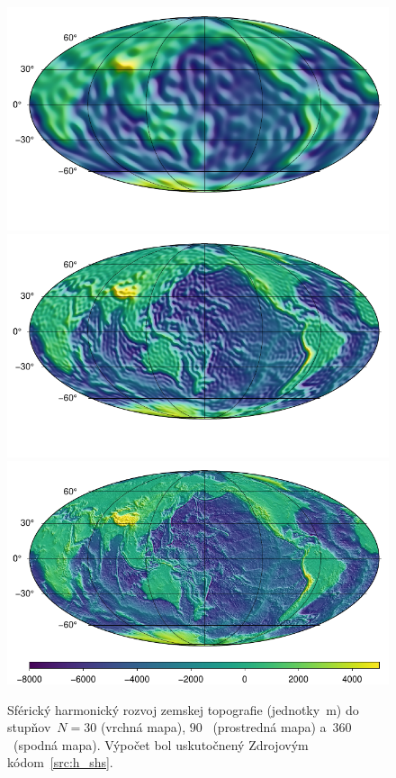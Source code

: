 \documentclass[a4paper,12pt]{book}
\begin{document}
\begin{figure}
\centering
\includegraphics{./fig-h-shs-nmax30.pdf}
\includegraphics{./fig-h-shs-nmax90.pdf}
\includegraphics{./fig-h-shs-nmax360.pdf}
\caption{Sférický harmonický rozvoj zemskej topografie (jednotky~m) do 
stupňov~$N = 30$ (vrchná mapa), $90$~ (prostredná mapa) a~$360$~(spodná mapa).  
Výpočet bol uskutočnený Zdrojovým kódom~\ref{src:h_shs}.} \label{fig:shs_h}
\end{figure}
\end{document}
